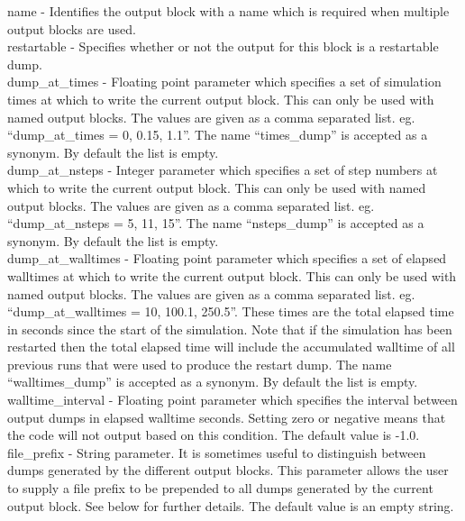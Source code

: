 {\emphtext name} - Identifies the output block with a name which is required
  when multiple output blocks are used.\\

{\emphtext restartable} - Specifies whether or not the output for this
  block is a restartable dump.\\

{\emphtext dump\_at\_times} - Floating point parameter which specifies a
  set of simulation times at which to write the current output block. This
  can only be used with named output blocks. The values are given as a
  comma separated list. eg. ``dump\_at\_times = 0, 0.15, 1.1''. The name
  ``times\_dump'' is accepted as a synonym. By default
  the list is empty.\\

{\emphtext dump\_at\_nsteps} - Integer parameter which specifies a
  set of step numbers at which to write the current output block. This
  can only be used with named output blocks. The values are given as a
  comma separated list. eg. ``dump\_at\_nsteps = 5, 11, 15''. The name
  ``nsteps\_dump'' is accepted as a synonym. By default
  the list is empty.\\

{\emphtext dump\_at\_walltimes} - Floating point parameter which specifies a
  set of elapsed walltimes at which to write the current output block. This
  can only be used with named output blocks. The values are given as a
  comma separated list. eg. ``dump\_at\_walltimes = 10, 100.1, 250.5''.
  These times are the total elapsed time in seconds since the start of the
  simulation. Note that if the
  simulation has been restarted then the total elapsed time will
  include the accumulated walltime of all previous runs that were
  used to produce the restart dump.
  The name ``walltimes\_dump'' is accepted as a synonym. By default
  the list is empty.\\

{\emphtext walltime\_interval} - Floating point parameter which specifies the
  interval between output dumps in elapsed walltime seconds. Setting zero or
  negative means that the code will not output based on this condition.
  The default value is -1.0.\\

{\emphtext file\_prefix} - String parameter. It is sometimes useful to
  distinguish between dumps generated by the different output blocks. This
  parameter allows the user to supply a file prefix to be prepended to all
  dumps generated by the current output block. See below for further details.
  The default value is an empty string.\\

